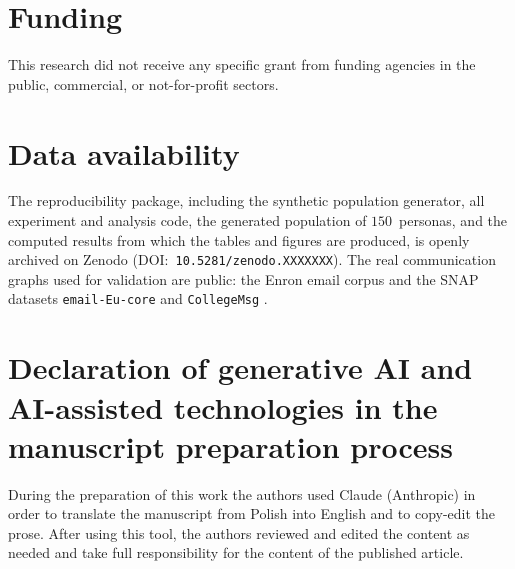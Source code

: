 \documentclass[a4paper,fleqn]{cas-sc}
\begin{document}
\section*{Funding}
This research did not receive any specific grant from funding agencies in the public, commercial,
or not-for-profit sectors.

\section*{Data availability}
The reproducibility package, including the synthetic population generator, all experiment and analysis code, the generated population of $150$~personas, and the computed results from which the tables and figures are produced, is openly archived on Zenodo (DOI:~\texttt{10.5281/zenodo.XXXXXXX}). The real
communication graphs used for validation are public: the Enron email corpus \citep{klimt2004enron}
and the SNAP datasets \texttt{email-Eu-core} and \texttt{CollegeMsg} \citep{leskovec2014snap}.

\section*{Declaration of generative AI and AI-assisted technologies in the manuscript preparation process}
During the preparation of this work the authors used Claude (Anthropic) in order to translate the
manuscript from Polish into English and to copy-edit the prose. After using this tool, the authors
reviewed and edited the content as needed and take full responsibility for the content of the
published article.

\clearpage


\end{document}
